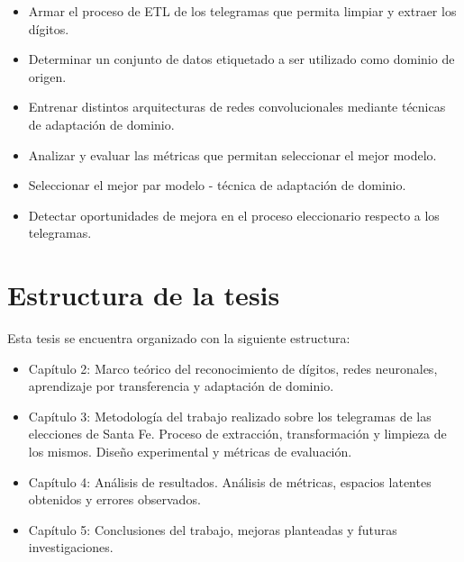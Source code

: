 \begin{itemize}
    \item Armar el proceso de ETL de los telegramas que permita limpiar y extraer los dígitos.
    \item Determinar un conjunto de datos etiquetado a ser utilizado como dominio de origen.
    \item Entrenar distintos arquitecturas de redes convolucionales mediante técnicas de adaptación de dominio.
    \item Analizar y evaluar las métricas que permitan seleccionar el mejor modelo.
    \item Seleccionar el mejor par modelo - técnica de adaptación de dominio.
    \item Detectar oportunidades de mejora en el proceso eleccionario respecto a los telegramas.
\end{itemize}

\section{Estructura de la tesis}

Esta tesis se encuentra organizado con la siguiente estructura:

\begin{itemize}
    \item Capítulo 2: Marco teórico del reconocimiento de dígitos, redes neuronales, aprendizaje por transferencia y adaptación
          de dominio.
    \item Capítulo 3: Metodología del trabajo realizado sobre los telegramas de las elecciones de Santa Fe. Proceso de
          extracción, transformación y limpieza de los mismos. Diseño experimental y métricas de evaluación.
    \item Capítulo 4: Análisis de resultados. Análisis de métricas, espacios latentes obtenidos y errores observados.
    \item Capítulo 5: Conclusiones del trabajo, mejoras planteadas y futuras investigaciones.
\end{itemize}